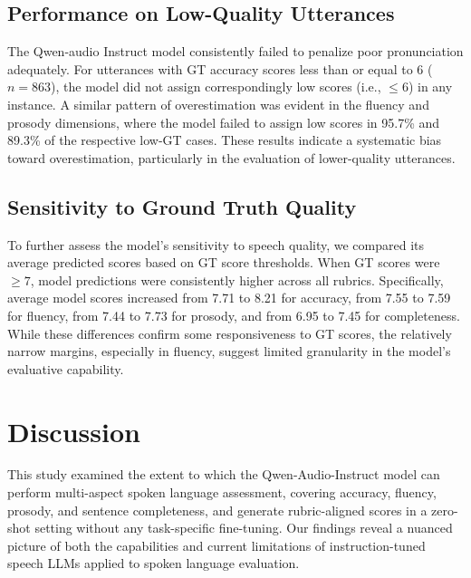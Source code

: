 \documentclass{Interspeech}
\begin{document}



\subsection{Performance on Low-Quality Utterances}
\label{low_quality}

The Qwen-audio Instruct model consistently failed to penalize poor pronunciation adequately. For utterances with GT accuracy scores less than or equal to 6 (\(n = 863\)), the model did not assign correspondingly low scores (i.e., \(\leq 6\)) in any instance. A similar pattern of overestimation was evident in the fluency and prosody dimensions, where the model failed to assign low scores in 95.7\% and 89.3\% of the respective low-GT cases. These results indicate a systematic bias toward overestimation, particularly in the evaluation of lower-quality utterances.


\subsection{Sensitivity to Ground Truth Quality}

To further assess the model's sensitivity to speech quality, we compared its average predicted scores based on GT score thresholds. When GT scores were \(\geq7\), model predictions were consistently higher across all rubrics. Specifically, average model scores increased from 7.71 to 8.21 for accuracy, from 7.55 to 7.59 for fluency, from 7.44 to 7.73 for prosody, and from 6.95 to 7.45 for completeness. While these differences confirm some responsiveness to GT scores, the relatively narrow margins, especially in fluency, suggest limited granularity in the model's evaluative capability.

\section{Discussion}
This study examined the extent to which the Qwen-Audio-Instruct model can perform multi-aspect spoken language assessment, covering accuracy, fluency, prosody, and sentence completeness, and generate rubric-aligned scores in a zero-shot setting without any task-specific fine-tuning. Our findings reveal a nuanced picture of both the capabilities and current limitations of instruction-tuned speech LLMs applied to spoken language evaluation.
\end{document}
